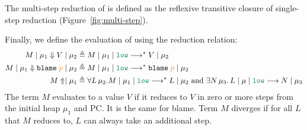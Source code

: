 The multi-step reduction of \CC is defined as the reflexive transitive closure
of single-step reduction (Figure~\ref{fig:multi-step}).

Finally, we define the evaluation of \CC using the reduction relation:
{\small
\begin{align*}
  M \mid \mu_1 \Downarrow V \mid \mu_2 &\triangleq \reducemult{M}{\mu_1}{\low}{V}{\mu_2} \\
  M \mid \mu_1 \Downarrow \blame{\bl{p}} \mid \mu_2 &\triangleq \reducemult{M}{\mu_1}{\low}{\blame{\bl{p}}}{\mu_2} \\
  M \Uparrow \mid \mu_1 &\triangleq \forall L\,\mu_2.\reducemult{M}{\mu_1}{\low}{L}{\mu_2} \text{~and~} \exists N\,\mu_3.\,\reduce{L}{\mu}{\low}{N}{\mu_3}
\end{align*}}
\noindent The \CC term $M$ evaluates to a value $V$ if it reduces to $V$ in zero
or more steps from the initial heap $\mu_1$ and \low PC. It is the same for
blame. Term $M$ diverges if for all $L$ that $M$ reduces to, $L$ can always take
an additional step.

